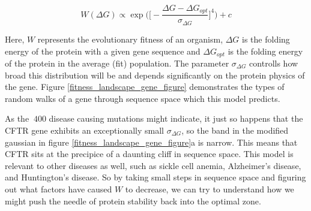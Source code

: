 \begin{equation}
	\label{fitness_equation}
	W(\Delta G) \propto \exp\bigg(\bigg[-\frac{\Delta G - \Delta G_{opt}}{\sigma_{\Delta G}}\bigg]^4\bigg) + c
\end{equation}

Here, $W$ represents the evolutionary fitness of an organism, $\Delta G$ is the folding energy of the protein with a given gene sequence and $\Delta G_{opt}$ is the folding energy of the protein in the average (fit) population. The parameter $\sigma_{\Delta G}$ controlls how broad this distribution will be and depends significantly on the protein physics of the gene. Figure \ref{fitness_landscape_gene_figure} demonstrates the types of random walks of a gene through sequence space which this model predicts. 

As the $\>400$ disease causing mutations might indicate\cite{cftr2}, it just so happens that the CFTR gene exhibits an exceptionally small $\sigma_{\Delta G}$, so the band in the modified gaussian in figure \ref{fitness_landscape_gene_figure}a is narrow. This means that CFTR sits at the precipice of a daunting cliff in sequence space. This model is relevant to other diseases as well, such as sickle cell anemia, Alzheimer's disease, and Huntington's disease\cite{depristo2005}. So by taking small steps in sequence space and figuring out what factors have caused $W$ to decrease, we can try to understand how we might push the needle of protein stability back into the optimal zone.

